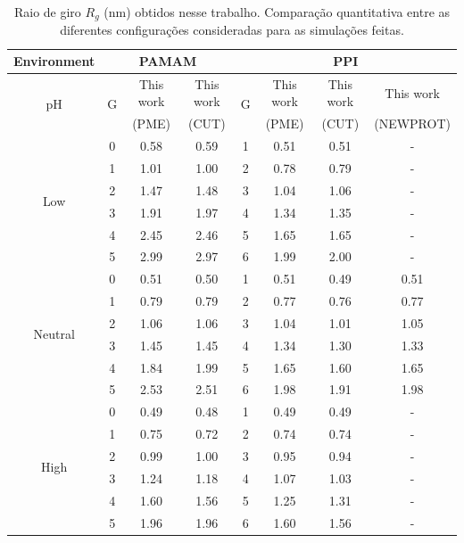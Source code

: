 \begin{table}[ht!]
\centering
\begin{tabular}{c|ccc|cccc}
\hline
  Environment   & \multicolumn{3}{c|}{PAMAM} & \multicolumn{4}{c}{PPI} \\
\hline
\multirow{2}{*}{pH}    & \multirow{2}{*}{G} &   This work & This work & \multirow{2}{*}{G} & This work & This work & This work  \\
&                               &   (PME)       &   (CUT)   &                               &   (PME)   &   (CUT)  &   (NEWPROT) \\
\hline
\hline
\multirow{6}{*}{Low} & 0    &   0.58  &   0.59  & 1 &  0.51  &   0.51  &   - \\
                        & 1    &   1.01  &   1.00  & 2 &  0.78  &   0.79  &   - \\
                        & 2    &   1.47  &   1.48  & 3 &  1.04  &   1.06  &   - \\
                        & 3    &   1.91  &   1.97  & 4 &  1.34  &   1.35  &   - \\
                        & 4    &   2.45  &   2.46  & 5 &  1.65  &   1.65  &   - \\
                        & 5    &   2.99  &   2.97  & 6 &  1.99  &   2.00  &   - \\
\hline
\multirow{6}{*}{Neutral}& 0 &   0.51  &   0.50  & 1 &  0.51  &   0.49  &   0.51 \\
                        & 1    &   0.79  &   0.79  & 2 &  0.77  &   0.76  &   0.77 \\
                        & 2    &   1.06  &   1.06  & 3 &  1.04  &   1.01  &   1.05 \\
                        & 3    &   1.45  &   1.45  & 4 &  1.34  &   1.30  &   1.33 \\
                        & 4    &   1.84  &   1.99  & 5 &  1.65  &   1.60  &   1.65 \\
                        & 5    &   2.53  &   2.51  & 6 &  1.98  &   1.91  &   1.98 \\
\hline
\multirow{6}{*}{High} & 0   &   0.49  &   0.48  & 1 &  0.49  &   0.49  &   - \\
                        & 1    &   0.75  &   0.72  & 2 &  0.74  &   0.74  &   - \\
                        & 2    &   0.99  &   1.00  & 3 &  0.95  &   0.94  &   - \\
                        & 3    &   1.24  &   1.18  & 4 &  1.07  &   1.03  &   - \\
                        & 4    &   1.60  &   1.56  & 5 &  1.25  &   1.31  &   - \\
                        & 5    &   1.96  &   1.96  & 6 &  1.60  &   1.56  &   - \\
\hline
\end{tabular}
\caption{Raio de giro $R_g$ (nm) obtidos nesse trabalho. Comparação quantitativa entre as diferentes configurações consideradas para as simulações feitas.}
\label{tab:Rg}
\end{table}


